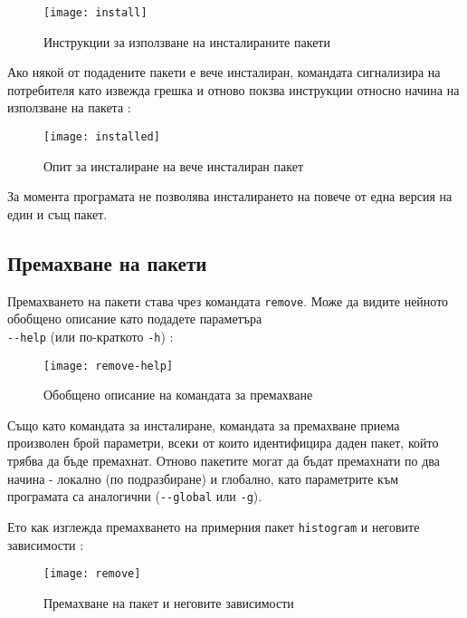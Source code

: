 \begin{figure}[h]
    \centering
    \texttt{[image: install]}
    \caption{Инструкции за използване на инсталираните пакети}
    \label{fig:install}
\end{figure}

Ако някой от подадените пакети е вече инсталиран, командата сигнализира на
потребителя като извежда грешка и отново покзва инструкции относно начина на
използване на пакета :

\begin{figure}[H]
    \centering
    \texttt{[image: installed]}
    \caption{Опит за инсталиране на вече инсталиран пакет}
    \label{fig:installed}
\end{figure}

За момента програмата не позволява инсталирането на повече от една версия на
един и същ пакет.


\subsection{Премахване на пакети}

Премахването на пакети става чрез командата \texttt{remove}. Може да видите
нейното обобщено описание като подадете параметъра \\
\texttt{-{}-help} (или по-краткото \texttt{-h}) :

\begin{figure}[h]
    \centering
    \texttt{[image: remove-help]}
    \caption{Обобщено описание на командата за премахване}
    \label{fig:remove-help}
\end{figure}

Също като командата за инсталиране, командата за премахване приема произволен
брой параметри, всеки от които идентифицира даден пакет, който трябва да бъде
премахнат. Отново пакетите могат да бъдат премахнати по два начина - локално
(по подразбиране) и глобално, като параметрите към програмата са аналогични
(\texttt{-{}-global} или \texttt{-g}).

Ето как изглежда премахването на примерния пакет \texttt{histogram} и неговите
зависимости :

\begin{figure}[h]
    \centering
    \texttt{[image: remove]}
    \caption{Премахване на пакет и неговите зависимости}
    \label{fig:remove}
\end{figure}

